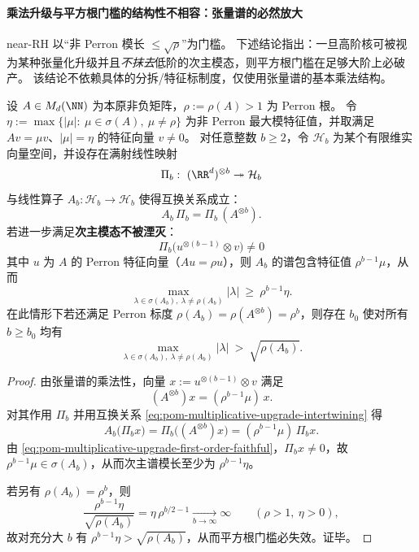 \paragraph{乘法升级与平方根门槛的结构性不相容：张量谱的必然放大}
near-RH 以“非 Perron 模长 \(\le \sqrt{\rho}\)”为门槛。
下述结论指出：一旦高阶核可被视为某种张量化升级并且\emph{不抹去}低阶的次主模态，则平方根门槛在足够大阶上必破产。
该结论不依赖具体的分拆/特征标制度，仅使用张量谱的基本乘法结构。

\begin{theorem}\label{thm:pom-multiplicative-upgrade-fatal-amplification}
设 \(A\in M_d(\NN)\) 为本原非负矩阵，\(\rho:=\rho(A)>1\) 为 Perron 根。
令 \(\eta:=\max\{|\mu|:\ \mu\in\sigma(A),\ \mu\neq\rho\}\) 为非 Perron 最大模特征值，并取满足 \(Av=\mu v\)、\(|\mu|=\eta\) 的特征向量 \(v\neq 0\)。
对任意整数 \(b\ge 2\)，令 \(\mathcal H_b\) 为某个有限维实向量空间，并设存在满射线性映射
\[
\Pi_b:\ (\RR^d)^{\otimes b}\twoheadrightarrow \mathcal H_b
\]
与线性算子 \(A_b:\mathcal H_b\to\mathcal H_b\) 使得互换关系成立：
\begin{equation}\label{eq:pom-multiplicative-upgrade-intertwining}
\boxed{\;A_b\,\Pi_b=\Pi_b\,(A^{\otimes b}).\;}
\end{equation}
若进一步满足\textbf{次主模态不被湮灭}：
\begin{equation}\label{eq:pom-multiplicative-upgrade-first-order-faithful}
\boxed{\;\Pi_b\bigl(u^{\otimes(b-1)}\otimes v\bigr)\neq 0\;}
\end{equation}
其中 \(u\) 为 \(A\) 的 Perron 特征向量（\(Au=\rho u\)），则 \(A_b\) 的谱包含特征值 \(\rho^{b-1}\mu\)，从而
\[
\max_{\lambda\in\sigma(A_b),\ \lambda\neq\rho(A_b)}|\lambda|
\ \ge\ \rho^{b-1}\eta.
\]
在此情形下若还满足 Perron 标度 \(\rho(A_b)=\rho(A^{\otimes b})=\rho^b\)，则存在 \(b_0\) 使对所有 \(b\ge b_0\) 均有
\[
\max_{\lambda\in\sigma(A_b),\ \lambda\neq\rho(A_b)}|\lambda|\ >\ \sqrt{\rho(A_b)}.
\]
\end{theorem}
\begin{proof}
由张量谱的乘法性，向量
\(
x:=u^{\otimes(b-1)}\otimes v
\)
满足
\[
(A^{\otimes b})x=(\rho^{b-1}\mu)\,x.
\]
对其作用 \(\Pi_b\) 并用互换关系 \eqref{eq:pom-multiplicative-upgrade-intertwining} 得
\[
A_b\bigl(\Pi_b x\bigr)=\Pi_b\bigl((A^{\otimes b})x\bigr)=(\rho^{b-1}\mu)\,\Pi_b x.
\]
由 \eqref{eq:pom-multiplicative-upgrade-first-order-faithful}，\(\Pi_b x\neq 0\)，故 \(\rho^{b-1}\mu\in\sigma(A_b)\)，从而次主谱模长至少为 \(\rho^{b-1}\eta\)。
\par
若另有 \(\rho(A_b)=\rho^b\)，则
\[
\frac{\rho^{b-1}\eta}{\sqrt{\rho(A_b)}}=\eta\,\rho^{b/2-1}\xrightarrow[b\to\infty]{}\infty
\qquad(\rho>1,\ \eta>0),
\]
故对充分大 \(b\) 有 \(\rho^{b-1}\eta>\sqrt{\rho(A_b)}\)，从而平方根门槛必失效。证毕。
\end{proof}

